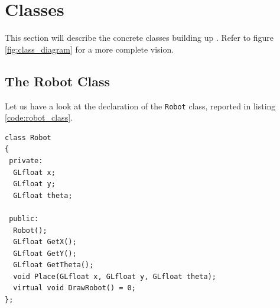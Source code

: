 \section{Classes}
\label{rear:classes}

This section will describe the concrete classes
building up \framework{}. Refer to figure \ref{fig:class_diagram}
for a more complete vision.

\subsection{The Robot Class}
\label{rear:classes:robotclass}

Let us have a look at the declaration of the \texttt{Robot}
class, reported in listing \ref{code:robot_class}.
\\
\begin{lstlisting}[caption={\texttt{Robot} class declaration}, label={code:robot_class}]
class Robot
{
 private:
  GLfloat x;
  GLfloat y;					
  GLfloat theta;

 public:
  Robot();
  GLfloat GetX();
  GLfloat GetY();
  GLfloat GetTheta();
  void Place(GLfloat x, GLfloat y, GLfloat theta);
  virtual void DrawRobot() = 0;
};
\end{lstlisting}

